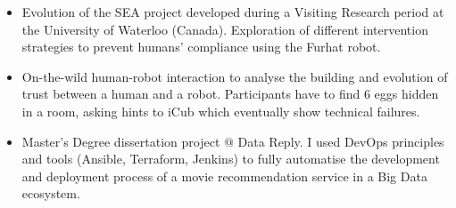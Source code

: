 \begin{itemize}
\item Evolution of the SEA project developed during a Visiting Research period at the University of Waterloo (Canada). Exploration of different intervention strategies to prevent humans' compliance using the Furhat robot.
\end{itemize}
\smallskip

\begin{itemize}
\item On-the-wild human-robot interaction to analyse the building and evolution of trust between a human and a robot. Participants have to find 6 eggs hidden in a room, asking hints to iCub which eventually show technical failures.
\end{itemize}
\smallskip

\begin{itemize}
\item Master's Degree dissertation project @ Data Reply. I used DevOps principles and tools (Ansible, Terraform, Jenkins) to fully automatise the development and deployment process of a movie recommendation service in a Big Data ecosystem.
\end{itemize}
\smallskip
\smallskip
\cvproject{}